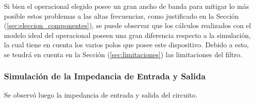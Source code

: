 Si bien el operacional elegido posee un gran ancho de banda para mitigar lo más posible estos problemas a las altas frecuencias, como justificado en la Sección (\ref{sec:eleccion_componentes}), se puede observar que los cálculos realizados con el modelo ideal del operacional poseen una gran diferencia respecto a la simulación, la cual tiene en cuenta los varios polos que posee este dispositivo. Debido a esto, se tendrá en cuenta en la Sección (\ref{sec:limitaciones}) las limitaciones del filtro.

\subsubsection{Simulación de la Impedancia de Entrada y Salida}

Se observó luego la impedancia de entrada y salida del circuito.

